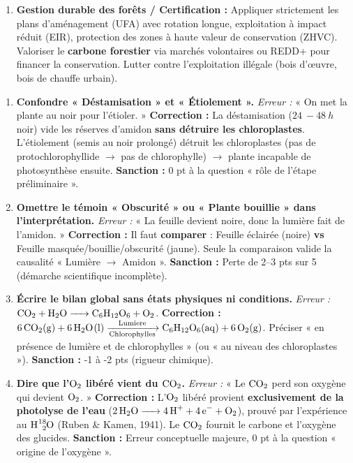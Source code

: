 \documentclass[11pt]{article}
\begin{document}
\begin{exoresolu}
\begin{enumerate}
\begin{enumerate}
                \item \textbf{Gestion durable des forêts / Certification :} Appliquer strictement les plans d'aménagement (UFA) avec rotation longue, exploitation à impact réduit (EIR), protection des zones à haute valeur de conservation (ZHVC). Valoriser le \textbf{carbone forestier} via marchés volontaires ou REDD+ pour financer la conservation. Lutter contre l'exploitation illégale (bois d'œuvre, bois de chauffe urbain).
            \end{enumerate}
    \end{enumerate}
\end{exoresolu}

\begin{attention}
    \begin{enumerate}
        \item \textbf{Confondre « Déstamisation » et « Étiolement ».} \textit{Erreur :} « On met la plante au noir pour l'étioler. » \textbf{Correction :} La déstamisation ($\SI{24}{-}\SI{48}{h}$ noir) vide les réserves d'amidon \textbf{sans détruire les chloroplastes}. L'étiolement (semis au noir prolongé) détruit les chloroplastes (pas de protochlorophyllide $\rightarrow$ pas de chlorophylle) $\rightarrow$ plante incapable de photosynthèse ensuite. \textbf{Sanction :} 0 pt à la question « rôle de l'étape préliminaire ».
        \item \textbf{Omettre le témoin « Obscurité » ou « Plante bouillie » dans l'interprétation.} \textit{Erreur :} « La feuille devient noire, donc la lumière fait de l'amidon. » \textbf{Correction :} Il faut \textbf{comparer} : Feuille éclairée (noire) \textbf{vs} Feuille masquée/bouillie/obscurité (jaune). Seule la comparaison valide la causalité « Lumière $\rightarrow$ Amidon ». \textbf{Sanction :} Perte de 2--3 pts sur 5 (démarche scientifique incomplète).
        \item \textbf{Écrire le bilan global sans états physiques ni conditions.} \textit{Erreur :} $\ce{CO2 + H2O -> C6H12O6 + O2}$. \textbf{Correction :} $\ce{6 CO2(g) + 6 H2O(l) ->[Lumiere][Chlorophylles] C6H12O6(aq) + 6 O2(g)}$. Préciser « en présence de lumière et de chlorophylles » (ou « au niveau des chloroplastes »). \textbf{Sanction :} -1 à -2 pts (rigueur chimique).
        \item \textbf{Dire que l'$\ce{O2}$ libéré vient du $\ce{CO2}$.} \textit{Erreur :} « Le $\ce{CO2}$ perd son oxygène qui devient $\ce{O2}$. » \textbf{Correction :} L'$\ce{O2}$ libéré provient \textbf{exclusivement de la photolyse de l'eau} ($\ce{2 H2O -> 4 H+ + 4 e- + O2}$), prouvé par l'expérience au $\ce{H2^{18}O}$ (Ruben \& Kamen, 1941). Le $\ce{CO2}$ fournit le carbone et l'oxygène des glucides. \textbf{Sanction :} Erreur conceptuelle majeure, 0 pt à la question « origine de l'oxygène ».

\end{enumerate}
\end{attention}
\end{document}
